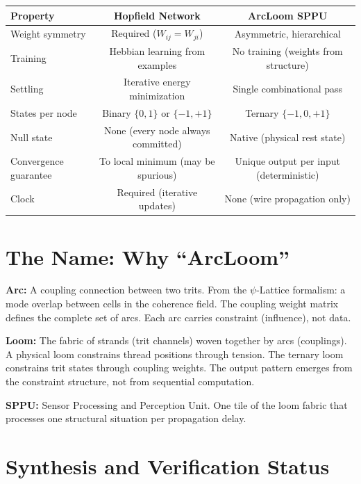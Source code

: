 \documentclass[11pt,a4paper]{article}
\begin{document}
\begin{center}
\begin{tabular}{lcc}
\toprule
\textbf{Property} & \textbf{Hopfield Network} & \textbf{ArcLoom SPPU} \\
\midrule
Weight symmetry & Required ($W_{ij} = W_{ji}$) & Asymmetric, hierarchical \\
Training & Hebbian learning from examples & No training (weights from structure) \\
Settling & Iterative energy minimization & Single combinational pass \\
States per node & Binary $\{0, 1\}$ or $\{-1, +1\}$ & Ternary $\{-1, 0, +1\}$ \\
Null state & None (every node always committed) & Native (physical rest state) \\
Convergence guarantee & To local minimum (may be spurious) & Unique output per input (deterministic) \\
Clock & Required (iterative updates) & None (wire propagation only) \\
\bottomrule
\end{tabular}
\end{center}

\section{The Name: Why ``ArcLoom''}

\textbf{Arc:} A coupling connection between two trits. From the $\psi$-Lattice formalism: a mode overlap between cells in the coherence field. The coupling weight matrix defines the complete set of arcs. Each arc carries constraint (influence), not data.

\textbf{Loom:} The fabric of strands (trit channels) woven together by arcs (couplings). A physical loom constrains thread positions through tension. The ternary loom constrains trit states through coupling weights. The output pattern emerges from the constraint structure, not from sequential computation.

\textbf{SPPU:} Sensor Processing and Perception Unit. One tile of the loom fabric that processes one structural situation per propagation delay.

\section{Synthesis and Verification Status}
\end{document}
